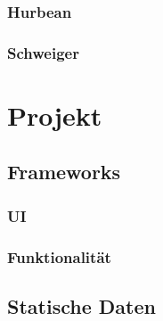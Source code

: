 \documentclass{mrtrash}
\begin{document}
\subsection{Hurbean}

\subsection{Schweiger}


\chapter{Projekt}

\section{Frameworks}

\subsection{UI}

\subsection{Funktionalität}

\section{Statische Daten}




\end{document}

